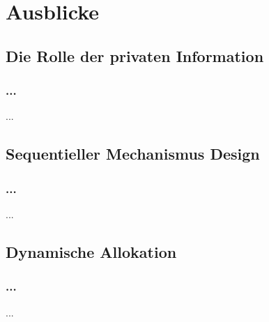 \section{Ausblicke}

\subsection{Die Rolle der privaten Information}
\begin{frame}
\frametitle{...}
\justifying
...

\end{frame}

\subsection{Sequentieller Mechanismus Design}
\begin{frame}
\frametitle{...}
\justifying
...

\end{frame}

\subsection{Dynamische Allokation}
\begin{frame}
\frametitle{...}
\justifying
...

\end{frame}
